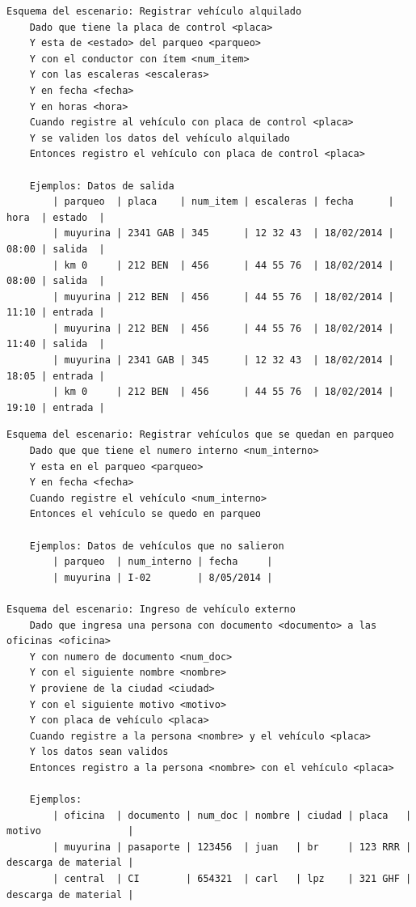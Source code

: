{\scriptsize
\begin{verbatim}
Esquema del escenario: Registrar vehículo alquilado
    Dado que tiene la placa de control <placa>
    Y esta de <estado> del parqueo <parqueo>
    Y con el conductor con ítem <num_item>
    Y con las escaleras <escaleras>
    Y en fecha <fecha>
    Y en horas <hora>
    Cuando registre al vehículo con placa de control <placa>
    Y se validen los datos del vehículo alquilado
    Entonces registro el vehículo con placa de control <placa>

    Ejemplos: Datos de salida
        | parqueo  | placa    | num_item | escaleras | fecha      | hora  | estado  |
        | muyurina | 2341 GAB | 345      | 12 32 43  | 18/02/2014 | 08:00 | salida  |
        | km 0     | 212 BEN  | 456      | 44 55 76  | 18/02/2014 | 08:00 | salida  |
        | muyurina | 212 BEN  | 456      | 44 55 76  | 18/02/2014 | 11:10 | entrada |
        | muyurina | 212 BEN  | 456      | 44 55 76  | 18/02/2014 | 11:40 | salida  |
        | muyurina | 2341 GAB | 345      | 12 32 43  | 18/02/2014 | 18:05 | entrada |
        | km 0     | 212 BEN  | 456      | 44 55 76  | 18/02/2014 | 19:10 | entrada |
\end{verbatim}
}

{\scriptsize
\begin{verbatim}
Esquema del escenario: Registrar vehículos que se quedan en parqueo
    Dado que que tiene el numero interno <num_interno>
    Y esta en el parqueo <parqueo>
    Y en fecha <fecha>
    Cuando registre el vehículo <num_interno>
    Entonces el vehículo se quedo en parqueo

    Ejemplos: Datos de vehículos que no salieron
        | parqueo  | num_interno | fecha     |
        | muyurina | I-02        | 8/05/2014 |

Esquema del escenario: Ingreso de vehículo externo
    Dado que ingresa una persona con documento <documento> a las oficinas <oficina>
    Y con numero de documento <num_doc>
    Y con el siguiente nombre <nombre>
    Y proviene de la ciudad <ciudad>
    Y con el siguiente motivo <motivo>
    Y con placa de vehículo <placa>
    Cuando registre a la persona <nombre> y el vehículo <placa>
    Y los datos sean validos
    Entonces registro a la persona <nombre> con el vehículo <placa>

    Ejemplos:
        | oficina  | documento | num_doc | nombre | ciudad | placa   | motivo               |
        | muyurina | pasaporte | 123456  | juan   | br     | 123 RRR | descarga de material |
        | central  | CI        | 654321  | carl   | lpz    | 321 GHF | descarga de material |
\end{verbatim}
}


